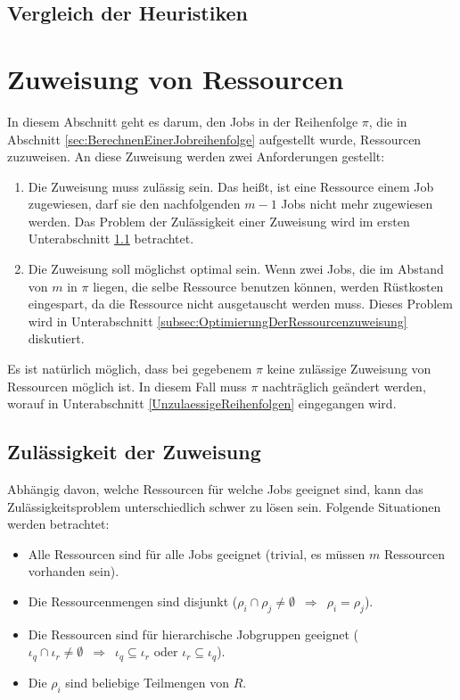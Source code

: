 \documentclass{scrreprt}
\begin{document}
\subsection{Vergleich der Heuristiken}



\section{Zuweisung von Ressourcen}
\label{sec:ZuweisungVonRessourcen}
In diesem Abschnitt geht es darum, den Jobs in der Reihenfolge $\pi$, die in Abschnitt \ref{sec:BerechnenEinerJobreihenfolge} aufgestellt wurde,
Ressourcen zuzuweisen. An diese Zuweisung werden zwei Anforderungen gestellt:
\begin{enumerate}
    \item Die Zuweisung muss zulässig sein. Das heißt, ist eine Ressource einem Job zugewiesen, darf sie den nachfolgenden $m-1$ Jobs nicht mehr zugewiesen werden.
        Das Problem der Zulässigkeit einer Zuweisung wird im ersten Unterabschnitt \ref{subsec:ZulaessigkeitDerZuweisung} betrachtet.
    \item Die Zuweisung soll möglichst optimal sein. Wenn zwei Jobs, die im Abstand von $m$ in $\pi$ liegen, die selbe Ressource benutzen können,
        werden Rüstkosten eingespart, da die Ressource nicht ausgetauscht werden muss.
        Dieses Problem wird in Unterabschnitt \ref{subsec:OptimierungDerRessourcenzuweisung} diskutiert.
\end{enumerate}
Es ist natürlich möglich, dass bei gegebenem $\pi$ keine zulässige Zuweisung von Ressourcen möglich ist.
In diesem Fall muss $\pi$ nachträglich geändert werden, worauf in Unterabschnitt \ref{UnzulaessigeReihenfolgen} eingegangen wird.

\subsection{Zulässigkeit der Zuweisung}
\label{subsec:ZulaessigkeitDerZuweisung}
Abhängig davon, welche Ressourcen für welche Jobs geeignet sind, kann das Zulässigkeitsproblem unterschiedlich schwer zu lösen sein.
Folgende Situationen werden betrachtet:
\begin{itemize}
    \item Alle Ressourcen sind für alle Jobs geeignet (trivial, es müssen $m$ Ressourcen vorhanden sein).
    \item Die Ressourcenmengen sind disjunkt ($\rho_i\cap\rho_j \neq \emptyset \enspace \Rightarrow \enspace \rho_i = \rho_j$).
    \item Die Ressourcen sind für hierarchische Jobgruppen geeignet 
        ($\iota_q\cap\iota_r \neq \emptyset \enspace \Rightarrow \enspace \iota_q\subseteq\iota_r$ oder $\iota_r\subseteq\iota_q$).
    \item Die $\rho_i$ sind beliebige Teilmengen von $R$.
\end{itemize}
\end{document}
